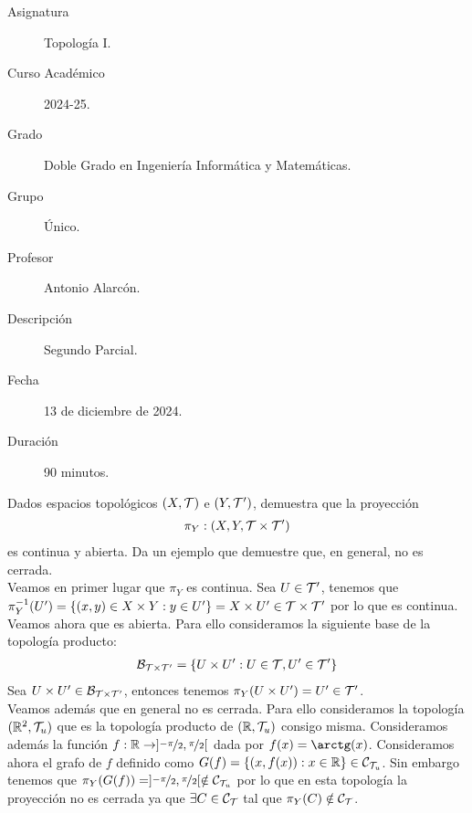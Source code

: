 \documentclass[12pt]{article}
\begin{document}

    
    

    \begin{description}
        \item[Asignatura] Topología I.
        \item[Curso Académico] 2024-25.
        \item[Grado] Doble Grado en Ingeniería Informática y Matemáticas.
        \item[Grupo] Único.
        \item[Profesor] Antonio Alarcón.
        \item[Descripción] Segundo Parcial.
        \item[Fecha] 13 de diciembre de 2024.
        \item[Duración] 90 minutos.
    
    \end{description}
    \newpage

    \begin{ejercicio}[3 puntos]
        Dados espacios topológicos $(X, \mathcal{T})$ e $(Y, \mathcal{T}')$, demuestra que la proyección 
        \begin{align*}
            \pi_Y : (X, Y, \mathcal{T}\times \mathcal{T}')
        \end{align*}
        es continua y abierta. Da un ejemplo que demuestre que, en general, no es cerrada.\\

        Veamos en primer lugar que $\pi_Y$ es continua. Sea $U\in \mathcal{T}'$, tenemos que $\pi_Y^{-1}(U')=\{(x,y)\in X\times Y : y\in U'\} = X\times U'\in \mathcal{T}\times \mathcal{T}'$ por lo que es continua.\\

        Veamos ahora que es abierta. Para ello consideramos la siguiente base de la topología producto:
        \begin{gather*}
            \mathcal{B}_{\mathcal{T}\times \mathcal{T}'}=\{U\times U' : U\in \mathcal{T}, U'\in \mathcal{T}'\}
        \end{gather*}
        Sea $U\times U'\in \mathcal{B}_{\mathcal{T}\times \mathcal{T}'}$, entonces tenemos $\pi_Y(U\times U')=U'\in \mathcal{T}'$.\\

        Veamos además que en general no es cerrada. Para ello consideramos la topología $(\mathbb{R}^2, \mathcal{T}_u)$ que es la topología producto de $(\mathbb{R}, \mathcal{T}_u)$ consigo misma. Consideramos además la función $f:\mathbb{R} \to ]\nicefrac{-\pi}{2}, \nicefrac{\pi}{2}[$ dada por $f(x)=\arctg(x)$. Consideramos ahora el grafo de $f$ definido como $G(f)=\{(x,f(x)):x\in \mathbb{R}\}\in \mathcal{C}_{\mathcal{T}_u}$. Sin embargo tenemos que $\pi_Y(G(f)) = ]\nicefrac{-\pi}{2}, \nicefrac{\pi}{2}[\notin \mathcal{C}_{\mathcal{T}_u}$ por lo que en esta topología la proyección no es cerrada ya que $\exists C\in \mathcal{C}_{\mathcal{T}}$ tal que $\pi_Y(C)\notin \mathcal{C}_{\mathcal{T}}$.
    \end{ejercicio}
\end{document}
